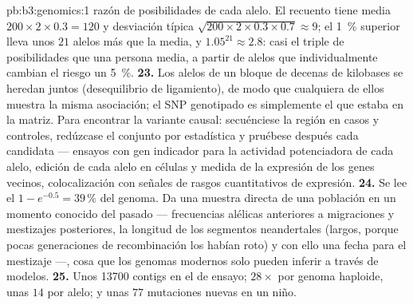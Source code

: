\begin{solution}{pb:b3:genomics:1}
razón de posibilidades de cada alelo. El recuento tiene media
$200\times 2\times 0.3 = 120$ y desviación típica
$\sqrt{200\times 2\times 0.3\times 0.7} \approx 9$; el \qty{1}{\%}
superior lleva unos $21$ alelos más que la media, y $1.05^{21} \approx
2.8$: casi el triple de posibilidades que una persona media, a partir de
alelos que individualmente cambian el riesgo un \qty{5}{\%}.
\textbf{23.} Los alelos de un bloque de decenas de kilobases se heredan
juntos (desequilibrio de ligamiento), de modo que cualquiera de ellos
muestra la misma asociación; el SNP genotipado es simplemente el que
estaba en la matriz. Para encontrar la variante causal: secuénciese la
región en casos y controles, redúzcase el conjunto por estadística y
pruébese después cada candidata --- ensayos con gen indicador para la
actividad potenciadora de cada alelo, edición de cada alelo en células y
medida de la expresión de los genes vecinos, colocalización con señales
de rasgos cuantitativos de expresión.
\textbf{24.} Se lee el $1 - e^{-0.5} = 39\,\%$ del genoma. Da una muestra
directa de una población en un momento conocido del pasado ---
frecuencias alélicas anteriores a migraciones y mestizajes posteriores,
la longitud de los segmentos neandertales (largos, porque pocas
generaciones de recombinación los habían roto) y con ello una fecha para
el mestizaje ---, cosa que los genomas modernos solo pueden inferir a
través de modelos.
\textbf{25.} Unos \num{13700} contigs en el  de ensayo;
$28\times$ por genoma haploide, unas $14$  por alelo; y unas
$77$ mutaciones nuevas en un niño.
\end{solution}
